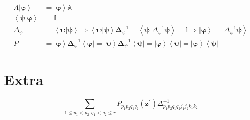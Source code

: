 \documentclass[aps,preprint]{revtex4}%
\begin{document}
\begin{align}
A\left\vert \mathbf{\varphi}\right\rangle  &  =\left\vert \mathbf{\varphi
}\right\rangle \mathbb{A}\\
\left\langle \left.  \mathbf{\psi}\right\vert \mathbf{\varphi}\right\rangle
&  =\mathbb{I}\\
\Delta_{\psi}  &  =\left\langle \left.  \mathbf{\psi}\right\vert \mathbf{\psi
}\right\rangle \Rightarrow\left\langle \left.  \mathbf{\psi}\right\vert
\mathbf{\psi}\right\rangle \mathbf{\Delta}_{\psi}^{-1}=\left\langle \left.
\mathbf{\psi}\right\vert \Delta_{\psi}^{-1}\mathbf{\psi}\right\rangle
=\mathbb{I}\Rightarrow\left\vert \mathbf{\varphi}\right\rangle =\left\vert
\Delta_{\psi}^{-1}\mathbf{\psi}\right\rangle \\
P  &  =\left\vert \mathbf{\varphi}\right\rangle \mathbf{\Delta}_{\varphi}%
^{-1}\left\langle \mathbf{\varphi}\right\vert =\left\vert \mathbf{\psi
}\right\rangle \mathbf{\Delta}_{\psi}^{-1}\left\langle \mathbf{\psi
}\right\vert =\left\vert \mathbf{\varphi}\right\rangle \left\langle
\mathbf{\psi}\right\vert =\left\vert \mathbf{\varphi}\right\rangle
\left\langle \mathbf{\psi}\right\vert
\end{align}


\section{Extra}%

\begin{equation}
\sum_{1\leq p_{1}<p_{2},q_{1}<q_{2}\leq r}P_{p_{1}p_{2}q_{1}q_{2}}\left(
\mathbf{z}^{\prime}\right)  \Delta_{p_{1}p_{2}q_{1}q_{2}j_{1}j_{2}k_{1}k_{2}%
}^{-1}%
\end{equation}
%
\end{document}

